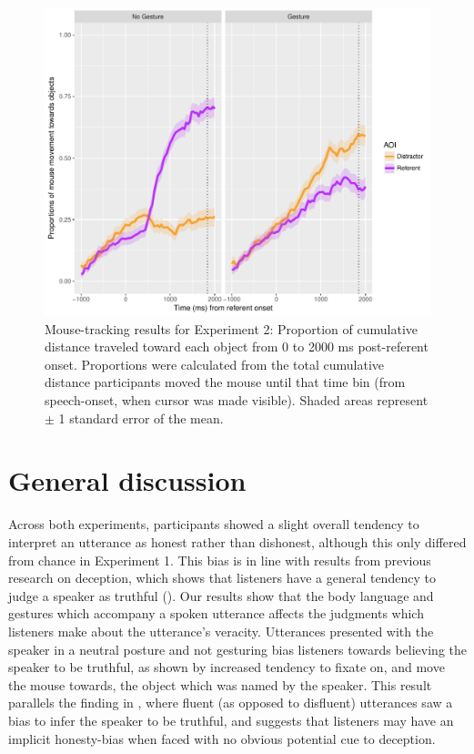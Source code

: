 \documentclass[a4paper,man,natbib]{apa6}
\begin{document}
\begin{figure}[Ht]
  \centering
	\includegraphics[width=\linewidth]{./img/e8_mouset.pdf}
  \caption{Mouse-tracking results for Experiment 2: Proportion of cumulative distance traveled toward each object from 0 to 2000 ms post-referent onset. Proportions were calculated from the total cumulative distance participants moved the mouse until that time bin (from speech-onset, when cursor was made visible). Shaded areas represent $\pm$ 1 standard error of the mean.}
  \label{fig:v2_mouse}
\end{figure}

\section{General discussion}
Across both experiments, participants showed a slight overall tendency to interpret an utterance as honest rather than dishonest, although this only differed from chance in Experiment 1. 
This bias is in line with results from previous research on deception, which shows that listeners have a general tendency to judge a speaker as truthful (\citealt{Vrij2000}). %
Our results show that the body language and gestures which accompany a spoken utterance affects the judgments which listeners make about the utterance's veracity.
Utterances presented with the speaker in a neutral posture and not gesturing bias listeners towards believing the speaker to be truthful, as shown by increased tendency to fixate on, and move the mouse towards, the object which was named by the speaker. 
This result parallels the finding in \citet{Loy2017}, where fluent (as opposed to disfluent) utterances saw a bias to infer the speaker to be truthful, and suggests that listeners may have an implicit honesty-bias when faced with no obvious potential cue to deception. 
\end{document}
